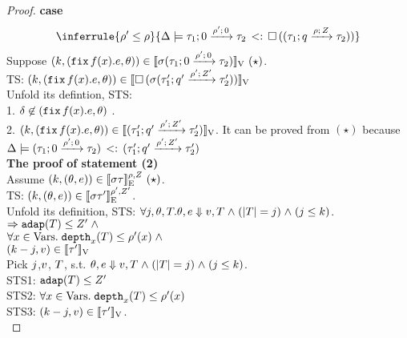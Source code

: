 \begin{proof}

\textbf{case}
\[
 \inferrule{
\dmap' \leq \dmap
    }{
       \Delta \models \sub{\tarr{\type_1}{\type_2}{0}{\dmap'}{0} }{  \tbox{(
          \tarr{\type_1}{\type_2}{\nnatbiA}{\dmap}{\nnatA} )  }
    } }
\]
Suppose  $ (\stepiA, (\efix f(x).\expr, \env) ) \in \lrv{\ienv (\tarr{\type_1}{\type_2}{0}{\dmap'}{0})  } ~(\star)$.\\
TS: $ (\stepiA, (\efix f(x).\expr, \env) ) \in \lrv{ \tbox{\ienv (\tarr{\type_1'}{\type_2'}{\nnatbiA'}{\dmap'}{\nnatA'})  } } $ \\
Unfold its defintion, STS:\\
1. $ \delta \not \in  (\efix f(x).\expr, \env)$ .  \\
2.  $(\stepiA, (\efix f(x).\expr, \env) ) \in  \lrv{(\tarr{\type_1'}{\type_2'}{\nnatbiA'}{\dmap'}{\nnatA'})}
$.  It can be proved from $(\star)$ because $ \Delta \models \sub{ (\tarr{\type_1}{\type_2}{0}{\dmap'}{0})} { (\tarr{\type_1'}{\type_2'}{\nnatbiA'}{\dmap'}{\nnatA'}) }  $ \\


\textbf{The proof of statement (2)} \\
Assume $(\stepiA, (\env, \expr)) \in
 \lre{\dmap}{\nnatA}{\ienv \type}~(\star)$. \\
%


TS: $(\stepiA, (\env, \expr)) \in
 \lre{\dmap'}{\nnatA'}{\ienv \type'}$.\\
Unfold its definition, STS:
$ \forall \stepiB, \env, \tr.  \env, \expr \bigstep \valr, \tr \conj
(\size{\tr} = \stepiB) \conj (\stepiB \leq \stepiA) $.\\
$\Rightarrow \adap(\tr) \leq \nnatA' \conj$\\
$\forall x \in \mbox{Vars}.\eapp  \ddep{x}(\tr) \leq \dmap'(x)\conj$\\
$ (\stepiA - \stepiB,  \valr) \in \lrv{\type'}$\\
%
Pick  $\stepiB$,$\valr$,  $\tr$, s.t.
$\env, \expr \bigstep \valr, \tr \conj
(\size{\tr} = \stepiB) \conj (\stepiB \leq \stepiA) $.\\
STS1: $\adap(\tr) \leq \nnatA' $ \\
STS2: $\forall x \in \mbox{Vars}.\eapp  \ddep{x}(\tr) \leq
\dmap'(x)$\\
STS3: $ (\stepiA - \stepiB,  \valr) \in \lrv{\type'}  $.\\



\end{proof}
